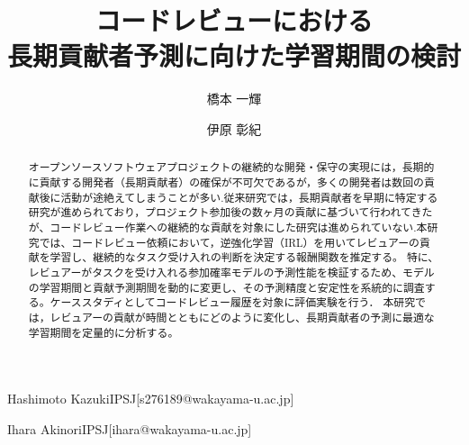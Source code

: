 \documentclass[submit,techrep,noauthor]{ipsj}
\begin{document}
\title{コードレビューにおける\\長期貢献者予測に向けた学習期間の検討}


\author{橋本 一輝}{Hashimoto Kazuki}{IPSJ}[s276189@wakayama-u.ac.jp]
\author{伊原 彰紀}{Ihara Akinori}{IPSJ}[ihara@wakayama-u.ac.jp]


\begin{abstract}
オープンソースソフトウェアプロジェクトの継続的な開発・保守の実現には，長期的に貢献する開発者（長期貢献者）の確保が不可欠であるが，多くの開発者は数回の貢献後に活動が途絶えてしまうことが多い.従来研究では，長期貢献者を早期に特定する研究が進められており，プロジェクト参加後の数ヶ月の貢献に基づいて行われてきたが、コードレビュー作業への継続的な貢献を対象にした研究は進められていない.本研究では、コードレビュー依頼において，逆強化学習（IRL）を用いてレビュアーの貢献を学習し、継続的なタスク受け入れの判断を決定する報酬関数を推定する。
特に、レビュアーがタスクを受け入れる参加確率モデルの予測性能を検証するため、モデルの学習期間と貢献予測期間を動的に変更し、その予測精度と安定性を系統的に調査する。ケーススタディとしてコードレビュー履歴を対象に評価実験を行う．
本研究では，レビュアーの貢献が時間とともにどのように変化し、長期貢献者の予測に最適な学習期間を定量的に分析する。
\end{abstract}


%
%
%

\maketitle

\end{document}
